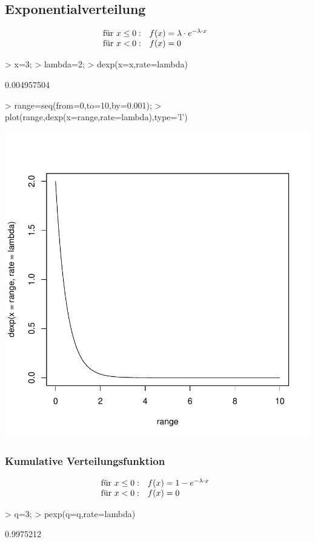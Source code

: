\subsection{Exponentialverteilung}
\[ \begin{array}{@{}ll}
  \text{für }x \leq 0: & f(x) = \lambda \cdot e^{-\lambda \cdot x} \\
  \text{für }x < 0:    & f(x) = 0
\end{array} \]
\begin{Schunk}
\begin{Sinput}
> x=3;
> lambda=2;
> dexp(x=x,rate=lambda)
\end{Sinput}
\begin{Soutput}
[1] 0.004957504
\end{Soutput}
\begin{Sinput}
> range=seq(from=0,to=10,by=0.001);
> plot(range,dexp(x=range,rate=lambda),type='l')
\end{Sinput}
\end{Schunk}
\includegraphics{definitionen-021}

\subsubsection{Kumulative Verteilungsfunktion}
\[ \begin{array}{@{}ll}
  \text{für }x \leq 0: & f(x) = 1 - e^{-\lambda \cdot x} \\
  \text{für }x < 0:    & f(x) = 0
\end{array} \]
\begin{Schunk}
\begin{Sinput}
> q=3;
> pexp(q=q,rate=lambda)
\end{Sinput}
\begin{Soutput}
[1] 0.9975212
\end{Soutput}
\end{Schunk}

